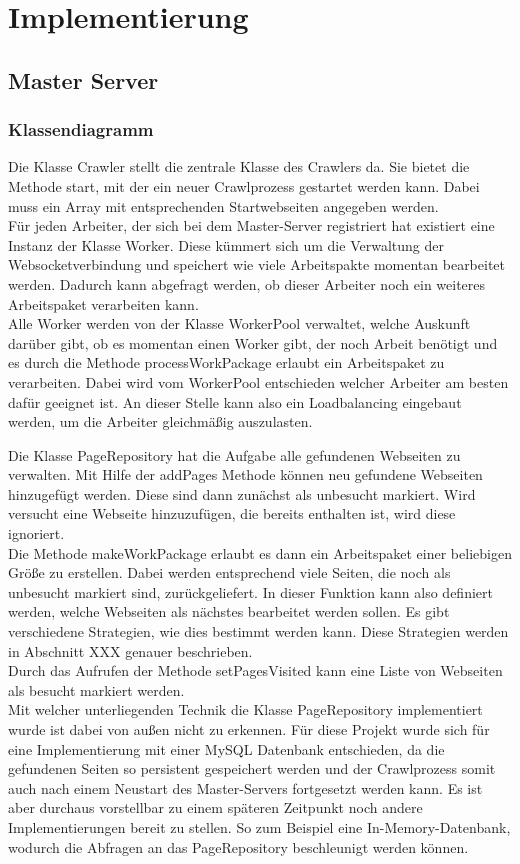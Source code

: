 \chapter{Implementierung}

\section{Master Server}
\subsection{Klassendiagramm}
Die Klasse Crawler stellt die zentrale Klasse des Crawlers da. Sie bietet die Methode start, mit der ein neuer Crawlprozess gestartet werden kann. Dabei muss ein Array mit entsprechenden Startwebseiten angegeben werden. \\
Für jeden Arbeiter, der sich bei dem Master-Server registriert hat existiert eine Instanz der Klasse Worker. Diese kümmert sich um die Verwaltung der Websocketverbindung und speichert wie viele Arbeitspakte momentan bearbeitet werden. Dadurch kann abgefragt werden, ob dieser Arbeiter noch ein weiteres Arbeitspaket verarbeiten kann. \\
Alle Worker werden von der Klasse WorkerPool verwaltet, welche Auskunft darüber gibt, ob es momentan einen Worker gibt, der noch Arbeit benötigt und es durch die Methode processWorkPackage erlaubt ein Arbeitspaket zu verarbeiten. Dabei wird vom WorkerPool entschieden welcher Arbeiter am besten dafür geeignet ist. An dieser Stelle kann also ein Loadbalancing eingebaut werden, um die Arbeiter gleichmäßig auszulasten.

Die Klasse PageRepository hat die Aufgabe alle gefundenen Webseiten zu verwalten. Mit Hilfe der addPages Methode können neu gefundene Webseiten hinzugefügt werden. Diese sind dann zunächst als unbesucht markiert. Wird versucht eine Webseite hinzuzufügen, die bereits enthalten ist, wird diese ignoriert.\\
Die Methode makeWorkPackage erlaubt es dann ein Arbeitspaket einer beliebigen Größe zu erstellen. Dabei werden entsprechend viele Seiten, die noch als unbesucht markiert sind, zurückgeliefert.
In dieser Funktion kann also definiert werden, welche Webseiten als nächstes bearbeitet werden sollen. Es gibt verschiedene Strategien, wie dies bestimmt werden kann. Diese Strategien werden in Abschnitt XXX genauer beschrieben.\\
Durch das Aufrufen der Methode setPagesVisited kann eine Liste von Webseiten als besucht markiert werden. \\
Mit welcher unterliegenden Technik die Klasse PageRepository implementiert wurde ist dabei von außen nicht zu erkennen. Für diese Projekt wurde sich für eine Implementierung mit einer MySQL Datenbank entschieden, da die gefundenen Seiten so persistent gespeichert werden und der Crawlprozess somit auch nach einem Neustart des Master-Servers fortgesetzt werden kann. Es ist aber durchaus vorstellbar zu einem späteren Zeitpunkt noch andere Implementierungen bereit zu stellen. So zum Beispiel eine In-Memory-Datenbank, wodurch die Abfragen an das PageRepository beschleunigt werden können.

